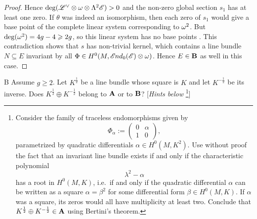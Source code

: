 \documentclass[A4paper, 12pt, british, reqno]{amsart}
\newcommand{\ot}{\otimes}
\newcommand{\op}{\oplus}
\newcommand{\dual}{^{\vee}}
\begin{document}
\begin{lm}
\begin{proof}
	Hence $\deg(\L\dual\ot\w\ot\Lambda^{2}\E)>0$ and the non-zero global section $s_{1}$ has at least one zero.
	If $\theta$ was indeed an isomorphism, then each zero of $s_{1}$ would give a base point of the complete linear system corresponding to $\omega^{2}$.
	But $\deg(\omega^{2})=4g-4\geqslant 2g$, so this linear system has no base points \cite[Corollary IV.3.2]{har77}.
	This contradiction shows that $s$ has non-trivial kernel, which contains a line bundle $N\subseteq E$ invariant by all $\Phi\in H^{0}(M,\sEnd_{0}(\E)\ot \w)$.
	Hence $E\in \mathbf{B}$ as well in this case.
    \end{proof}
\end{lm}

\begin{cexe}{B}
    Assume $g\geqslant 2$.
    Let $K^{\frac{1}{2}}$ be a line bundle whose square is $K$ and let $K^{-\frac{1}{2}}$ be its inverse.
    Does $K^{\frac{1}{2}}\op K^{-\frac{1}{2}}$ belong to $\mathbf{A}$ or to $\mathbf{B}$?
    [\textit{Hints below}
    \footnote{
	Consider the family of traceless endomorphisms given by
    \[
	\Phi_{\alpha}:=
	\begin{pmatrix}
	    0 & \alpha \\
	    1 & 0
	\end{pmatrix},
	\]
	parametrized by quadratic differentials $\alpha\in H^{0}(M,K^{2})$.
	Use without proof the fact that an invariant line bundle exists if and only if the characteristic polynomial
	\[ \lambda^{2}-\alpha \]
	has a root in $H^{0}(M,K)$, i.e.~if and only if the quadratic differential $\alpha$ can be written as a square $\alpha=\beta^{2}$ for some differential form $\beta\in H^{0}(M,K)$.
	If $\alpha$ was a square, its zeros would all have multiplicity at least two.
	Conclude that $K^{\frac{1}{2}}\op K^{-\frac{1}{2}}\in \bfA$ using Bertini's theorem.
    }]
\end{cexe}
\end{document}

